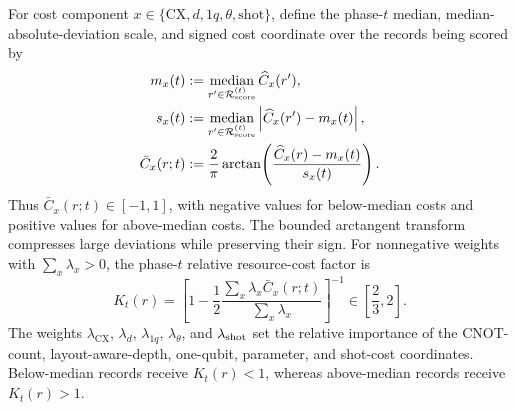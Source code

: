 \documentclass[
  reprint,
  amsmath,
  amssymb,
  aps,
  pra,
  nofootinbib,
  superscriptaddress,
  floatfix
]{revtex4-2}
\begin{document}
For cost component
\(x\in\{\mathrm{CX},d,1q,\theta,\mathrm{shot}\}\), define the
phase-\(t\) median, median-absolute-deviation scale, and signed cost coordinate
over the records being scored by \cite{IglewiczHoaglin1993}
\begin{equation}
\begin{aligned}
m_x(t)
&:=
\operatorname*{median}_{r'\in\mathcal R_{\rm score}^{(t)}}
\widehat C_x(r'),\\
s_x(t)
&:=
\operatorname*{median}_{r'\in\mathcal R_{\rm score}^{(t)}}
\left|\widehat C_x(r')-m_x(t)\right|,\\
\bar C_x(r;t)
&:=
\frac{2}{\pi}
\arctan\!\left(
\frac{\widehat C_x(r)-m_x(t)}{s_x(t)}
\right).
\end{aligned}
\label{eq:cost_robust_excess}
\end{equation}
Thus \(\bar C_x(r;t)\in[-1,1]\), with negative values for below-median costs
and positive values for above-median costs. The bounded arctangent transform
compresses large deviations while preserving their sign. For nonnegative
weights with \(\sum_x\lambda_x>0\), the phase-\(t\)
relative resource-cost factor is
\begin{equation}
K_t(r)
=
\left[
1-\frac{1}{2}
\frac{
\displaystyle\sum_x\lambda_x\bar C_x(r;t)
}{
\displaystyle\sum_x\lambda_x
}
\right]^{-1}
\in\left[\frac{2}{3},2\right].
\label{eq:hardware_cost_sum}
\end{equation}
%
The weights \(\lambda_{\mathrm{CX}}\), \(\lambda_d\), \(\lambda_{1q}\),
\(\lambda_\theta\), and \(\lambda_{\rm shot}\) set the relative importance of
the CNOT-count, layout-aware-depth, one-qubit, parameter, and shot-cost
coordinates. Below-median records receive \(K_t(r)<1\), whereas above-median
records receive \(K_t(r)>1\).
\end{document}

